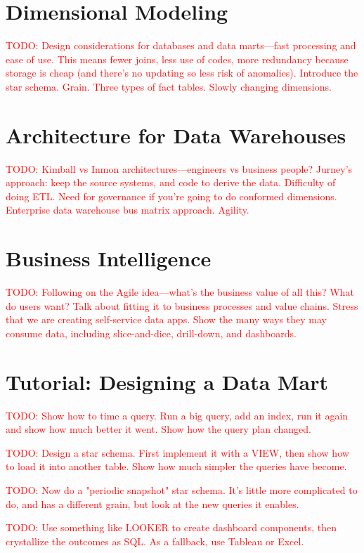 \documentclass[11pt]{book}
\newcommand{\todo}[1]{\textcolor{red}{TODO: #1}} %
\begin{document}
\section{Dimensional Modeling}
\todo{Design considerations for databases and data marts---fast processing and ease of use.  This means fewer joins, less use of codes, more redundancy because storage is cheap (and there's no updating so less risk of anomalies).  Introduce the star schema.  Grain.  Three types of fact tables.  Slowly changing dimensions.}

\section{Architecture for Data Warehouses}
\todo{Kimball vs Inmon architectures---engineers vs business people?  Jurney's approach: keep the source systems, and code to derive the data.  Difficulty of doing ETL.  Need for governance if you're going to do conformed dimensions.  Enterprise data warehouse bus matrix approach. Agility.}

\section{Business Intelligence}
\todo{Following on the Agile idea---what's the business value of all this? What do users want?  Talk about fitting it to business processes and value chains.  Stress that we are creating self-service data apps.  Show the many ways they may consume data, including slice-and-dice, drill-down, and dashboards.}


\section{Tutorial: Designing a Data Mart}

\todo{Show how to time a query.  Run a big query, add an index, run it again and show how much better it went.  Show how the query plan changed.}

\todo{Design a star schema.  First implement it with a VIEW, then show how to load it into another table.  Show how much simpler the queries have become.}

\todo{Now do a "periodic snapshot" star schema.  It's little more complicated to do, and has a different grain, but look at the new queries it enables.}

\todo{Use something like LOOKER to create dashboard components, then crystallize the outcomes as SQL.  As a fallback, use Tableau or Excel.}
\end{document}
